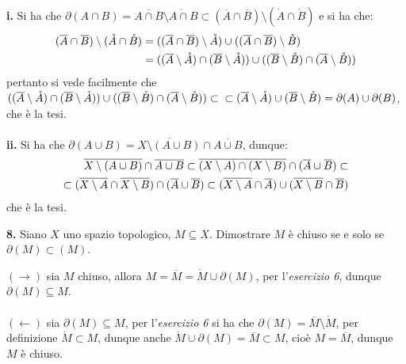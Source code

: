\documentclass[oneside, 11pt]{amsbook}
\makeatletter
\newcommand{\0}{{(0)}}
\newcommand{\3}{{(3)}}
\theoremstyle{colonplain}
\theoremstyle{colondefinition}
\theoremstyle{colonremark}
\numberwithin{equation}{chapter}
\renewcommand{\proofname}{Dimostrazione}
\renewenvironment{proof}[1][\proofname]{\par
  \pushQED{\qed}%
  \normalfont \topsep6\p@\@plus6\p@\relax
  \trivlist
  \item[\hskip\labelsep\bfseries #1:]\ignorespaces
}{%
  \popQED\endtrivlist\@endpefalse
}
\makeatother
\begin{document}
\begin{proof}
\textbf{i.} Si ha che $\partial (A \cap B) = \overline{A \cap B} \setminus \mathring{A \cap B} \subset (\overline{A} \cap \overline{B}) \setminus (\mathring{A} \cap \mathring{B})$ e si ha che:
\begin{align}
    (\overline{A} \cap \overline{B}) \setminus (\mathring{A} \cap \mathring{B}) &= ((\overline{A} \cap \overline{B}) \setminus \mathring{A}) \cup ((\overline{A} \cap \overline{B}) \setminus \mathring{B}) \notag \\
    &= ((\overline{A} \setminus \mathring{A}) \cap (\overline{B} \setminus \mathring{A})) \cup ((\overline{B} \setminus \mathring{B}) \cap (\overline{A} \setminus \mathring{B})) \notag
\end{align}
pertanto si vede facilmente che $((\overline{A} \setminus \mathring{A}) \cap (\overline{B} \setminus \mathring{A})) \cup ((\overline{B} \setminus \mathring{B}) \cap (\overline{A} \setminus \mathring{B})) \subset\\\subset (\overline{A} \setminus \mathring{A}) \cup (\overline{B} \setminus \mathring{B}) = \partial (A) \cup \partial (B)$, che è la tesi. \\ \\
\textbf{ii.} Si ha che $\partial (A \cup B) = \overline{X \setminus (A \cup B)} \cap \overline{A \cup B}$, dunque:
\begin{align}
    \overline{X \setminus (A \cup B)} \cap \overline{A \cup B} \subset \overline{(X \setminus A) \cap (X \setminus B)} \cap (\overline{A} \cup \overline{B}) \subset \notag \\
    \subset (\overline{X \setminus A} \cap \overline{X \setminus B}) \cap (\overline{A} \cup \overline{B}) \subset (\overline{X \setminus A} \cap \overline{A}) \cup (\overline{X \setminus B} \cap \overline{B}) \notag
\end{align}
che è la tesi.
\end{proof}

\textbf{8.} Siano $X$ uno spazio topologico, $M \subseteq X$. Dimostrare $M$ è chiuso se e solo se $\partial(M) \subset (M)$.
\begin{proof}
$(\rightarrow)$ sia $M$ chiuso, allora $M = \overline{M} = \mathring{M} \cup \partial(M)$, per l'\textit{esercizio 6}, dunque $\partial(M) \subseteq M$. \\ \\
$(\leftarrow)$ sia $\partial(M) \subseteq M$, per l'\textit{esercizio 6} si ha che $\partial(M) = \overline{M} \setminus \mathring{M}$, per definizione $\mathring{M} \subset M$, dunque anche $\mathring{M} \cup \partial(M) = \overline{M} \subset M$, cioè $M = \overline{M}$, dunque $M$ è chiuso.
\end{proof}
\end{document}
